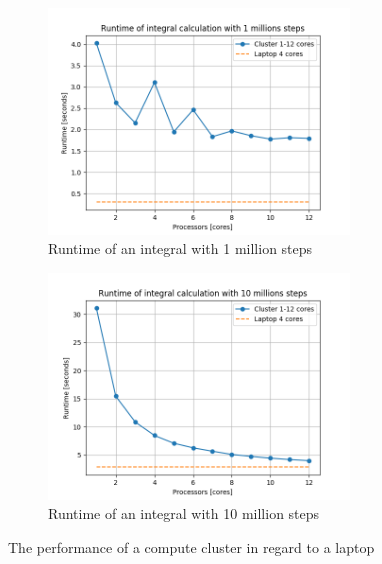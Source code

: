 \documentclass[../Head/Report.tex]{subfiles}
\begin{document}
\begin{figure}[H]
\centering
  \begin{subfigure}[b]{0.48\textwidth}
  \centering
    \includegraphics[height=6cm]{../Figures/integral_runtime_test_1mio.png}
    \caption{Runtime of an integral with 1 million steps}
    \label{fig:integral_runtime_1mio}
  \end{subfigure}
  \hfill
  \begin{subfigure}[b]{0.48\textwidth}
  \centering
    \includegraphics[height=6cm]{../Figures/integral_runtime_test_10mio.png}
    \caption{Runtime of an integral with 10 million steps}
    \label{fig:integral_runtime_10mio}
  \end{subfigure}
  \caption{The performance of a compute cluster in regard to a laptop}
  \label{fig:integral_runtime_1_10mio}
\end{figure}
\end{document}
